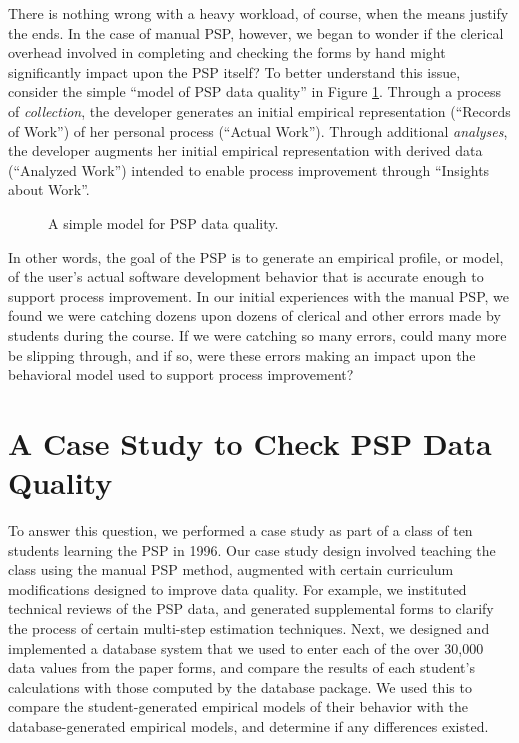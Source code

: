 There is nothing wrong with a heavy workload, of course, when the means
justify the ends. In the case of manual PSP, however, we began to wonder if
the clerical overhead involved in completing and checking the forms by hand
might significantly impact upon the PSP itself?  To better understand this
issue, consider the simple ``model of PSP data quality'' in Figure
\ref{fig:model}. Through a process of {\em collection}, the developer
generates an initial empirical representation (``Records of Work'') of her
personal process (``Actual Work'').  Through additional {\em analyses}, the
developer augments her initial empirical representation with derived data
(``Analyzed Work'') intended to enable process improvement through
``Insights about Work''.


\begin{figure} [tp]
    {\centerline{}}
    \caption{\label{fig:model} A simple model for PSP data quality.
      }
\end{figure}

In other words, the goal of the PSP is to generate an empirical profile, or
model, of the user's actual software development behavior that is accurate
enough to support process improvement.  In our initial experiences with the 
manual PSP, we found we were catching dozens upon dozens of clerical and 
other errors made by students during the course. If we were catching so
many errors, could many more be slipping through, and if so, were these
errors making an impact upon the behavioral model used to support
process improvement?

\section{A Case Study to Check PSP Data Quality}

To answer this question, we performed a case study as part of a class of
ten students learning the PSP in 1996. Our case study
design involved teaching the class using the manual PSP method, augmented
with certain curriculum modifications designed to improve data quality. For
example, we instituted technical reviews of the PSP data, and generated
supplemental forms to clarify the process of certain multi-step estimation
techniques.  Next, we designed and implemented a database system that we
used to enter each of the over 30,000 data values from the paper forms, and
compare the results of each student's calculations with those computed by
the database package.  We used this to compare the student-generated
empirical models of their behavior with the database-generated empirical
models, and determine if any differences existed.

